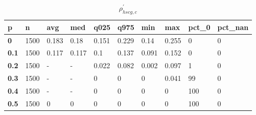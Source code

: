 \begin{table}[h]
 \centering 
\footnotesize
\caption{$\rho_{hscg,c}^\prime $}
\label{tab:alphahscgc}
\begin{tabular}[h]{|l|l|l|l|l|l|l|l|l|l|
    } \hline
\textbf{ p} & \textbf{ n} & \textbf{ avg} & \textbf{ med} & \textbf{ q025} & \textbf{ q975} & \textbf{ min} & \textbf{ max} & \textbf{ pct\_0} & \textbf{ pct\_nan}
    \\ \hline
  \textbf{  0} & 1500 & 0.183 &  0.18 & 0.151 & 0.229 &  0.14 & 0.255 &   0 & 0
    \\ \hline
  \textbf{0.1} & 1500 & 0.117 & 0.117 &   0.1 & 0.137 & 0.091 & 0.152 &   0 & 0
    \\ \hline
  \textbf{0.2} & 1500 & - & - & 0.022 & 0.082 & 0.002 & 0.097 &   1 & 0
    \\ \hline
  \textbf{0.3} & 1500 & - & - &     0 &     0 &     0 & 0.041 &  99 & 0
    \\ \hline
  \textbf{0.4} & 1500 & - & - &     0 &     0 &     0 &     0 & 100 & 0
    \\ \hline
  \textbf{0.5} & 1500 &     0 &     0 &     0 &     0 &     0 &     0 & 100 & 0
    \\ \hline
 \end{tabular}
 \end{table}
